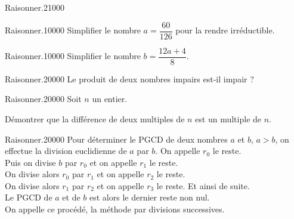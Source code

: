 \begin{pageParcourst}
\begin{ExoCtN}{Raisonner.}{2}{1}{0}{0}{0}
\begin{minipage}{0.5\linewidth}
 \end{minipage}


 
\end{ExoCtN}
 
\end{pageParcourst}
%




\begin{pageAuto} 

 
\begin{ExoAutoN}{Raisonner.}{1}{0}{0}{0}{0}
Simplifier le nombre $a=\dfrac{60}{126}$ pour la rendre irréductible. 
\end{ExoAutoN}
\begin{ExoAutoN}{Raisonner.}{1}{0}{0}{0}{0}
Simplifier le nombre $b=\dfrac{12a+4}{8}$. 
\end{ExoAutoN}
\begin{ExoAutoN}{Raisonner.}{2}{0}{0}{0}{0}
Le produit de deux nombres impairs est-il impair ? 
\end{ExoAutoN}


\begin{ExoAutoN}{Raisonner.}{2}{0}{0}{0}{0}
Soit $n$ un entier.

Démontrer que la différence de deux multiples de $n$ est un multiple de $n$. 
\end{ExoAutoN}

\begin{ExoAutoN}{Raisonner.}{2}{0}{0}{0}{0}
Pour déterminer le PGCD de deux nombres $a$ et $b$, $a>b$, on effectue la division euclidienne de $a$ par $b$. On appelle $r_0$ le reste. \\
Puis on divise $b$ par $r_0$ et on appelle $r_1$ le reste. \\
On divise alors $r_0$ par $r_1$ et on appelle $r_2$ le reste.\\ 
On divise alors $r_1$ par $r_2$ et on appelle $r_3$ le reste. Et ainsi de suite. \\ 
Le PGCD de $a$ et de $b$ est alors le dernier reste non nul.\\ 
On appelle ce procédé, la méthode par divisions successives.


\end{ExoAutoN}
\end{pageAuto}
